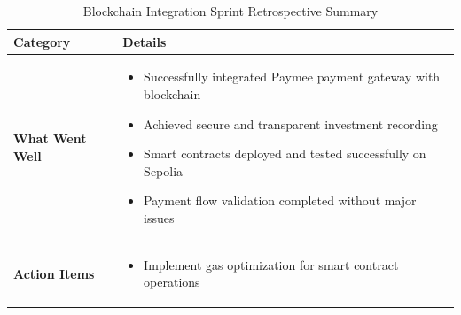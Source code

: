\begin{table}[htbp]
    \centering
    \begin{tabular}{|p{3cm}|p{10cm}|}
        \hline
        \textbf{Category} & \textbf{Details} \\
        \hline
        \textbf{What Went Well} & 
        \begin{itemize}
            \item Successfully integrated Paymee payment gateway with blockchain
            \item Achieved secure and transparent investment recording
            \item Smart contracts deployed and tested successfully on Sepolia
            \item Payment flow validation completed without major issues
        \end{itemize} \\
        \hline
        \textbf{Action Items} & 
        \begin{itemize}
            \item Implement gas optimization for smart contract operations
        \end{itemize} \\
        \hline
    \end{tabular}
    \caption{Blockchain Integration Sprint Retrospective Summary}
    \label{tab:blockchain-retrospective}
\end{table}